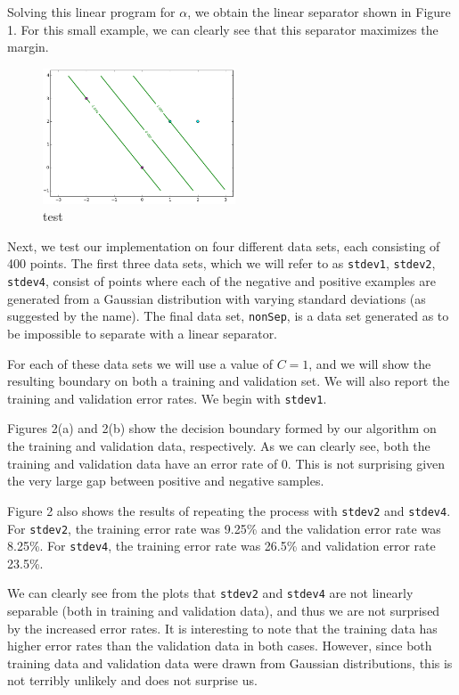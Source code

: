 \documentclass{sigchi}
\begin{document}
\large
Solving this linear program for $\alpha$, we obtain the linear separator shown in Figure 1. For this small example, we can clearly see that this separator maximizes the margin.

\begin{figure}
\centering
\includegraphics[width=2.25in]{plots/1-1.png}
\caption{test}
\end{figure}

Next, we test our implementation on four different data sets, each consisting of 400 points. The first three data sets, which we will refer to as \texttt{stdev1}, \texttt{stdev2}, \texttt{stdev4}, consist of points where each of the negative and positive examples are generated from a Gaussian distribution with varying standard deviations (as suggested by the name). The final data set, \texttt{nonSep}, is a data set generated as to be impossible to separate with a linear separator.

For each of these data sets we will use a value of $C = 1$, and we will show the resulting boundary on both a training and validation set. We will also report the training and validation error rates. We begin with \texttt{stdev1}.

Figures 2(a) and 2(b) show the decision boundary formed by our algorithm on the training and validation data, respectively. As we can clearly see, both the training and validation data have an error rate of 0. This is not surprising given the very large gap between positive and negative samples.

Figure 2 also shows the results of repeating the process with \texttt{stdev2} and \texttt{stdev4}. For \texttt{stdev2}, the training error rate was 9.25\% and the validation error rate was 8.25\%. For \texttt{stdev4}, the training error rate was 26.5\% and validation error rate 23.5\%.

We can clearly see from the plots that \texttt{stdev2} and \texttt{stdev4} are not linearly separable (both in training and validation data), and thus we are not surprised by the increased error rates. It is interesting to note that the training data has higher error rates than the validation data in both cases. However, since both training data and validation data were drawn from Gaussian distributions, this is not terribly unlikely and does not surprise us.
\end{document}
